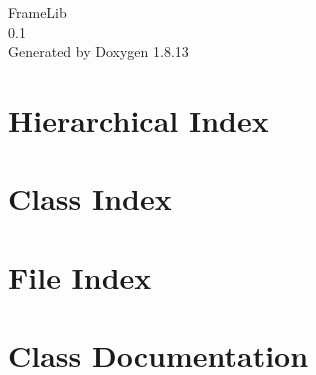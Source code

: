\documentclass[twoside]{book}
\newcommand{\+}{\discretionary{\mbox{\scriptsize$\hookleftarrow$}}{}{}}
\newcommand{\clearemptydoublepage}{%
  \newpage{\pagestyle{empty}\cleardoublepage}%
}
\begin{document}
\hypersetup{pageanchor=false,
             bookmarksnumbered=true,
             pdfencoding=unicode
            }
\begin{titlepage}
\vspace*{7cm}
\begin{center}%
{\Large Frame\+Lib \\[1ex]\large 0.\+1 }\\
\vspace*{1cm}
{\large Generated by Doxygen 1.8.13}\\
\end{center}
\end{titlepage}
\clearemptydoublepage
{}
\tableofcontents
\clearemptydoublepage
{}
\hypersetup{pageanchor=true}

\chapter{Hierarchical Index}

\chapter{Class Index}

\chapter{File Index}

\chapter{Class Documentation}








































\end{document}
